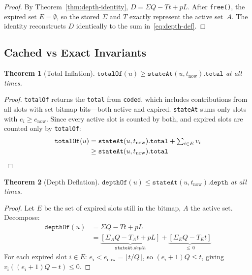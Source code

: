 \documentclass[10pt,a4paper,twocolumn]{article}
\theoremstyle{definition}
\theoremstyle{plain}
\newtheorem{theorem}{Theorem}[section]
\theoremstyle{remark}
\begin{document}
\begin{proof}
By Theorem~\ref{thm:depth-identity}, $D = \Sigma Q - Tt + pL$. After \texttt{free()}, the expired set $E = \emptyset$, so the stored $\Sigma$ and $T$ exactly represent the active set~$A$. The identity reconstructs $D$ identically to the sum in~\eqref{eq:depth-def}.
\end{proof}

\subsection{Cached vs Exact Invariants}

\begin{theorem}[Total Inflation]
\label{thm:total-inflation}
$\texttt{totalOf}(u) \geq \texttt{stateAt}(u, t_{\text{now}}).\texttt{total}$ at all times.
\end{theorem}

\begin{proof}
\texttt{totalOf} returns the \texttt{total} from \texttt{coded}, which includes contributions from all slots with set bitmap bits---both active and expired. \texttt{stateAt} sums only slots with $e_i \geq e_{\text{now}}$. Since every active slot is counted by both, and expired slots are counted only by \texttt{totalOf}:
\begin{align*}
\texttt{totalOf}(u) &= \texttt{stateAt}(u,t_{\text{now}}).\texttt{total} + \textstyle\sum_{i \in E} v_i \\
                     &\geq \texttt{stateAt}(u,t_{\text{now}}).\texttt{total} \qedhere
\end{align*}
\end{proof}

\begin{theorem}[Depth Deflation]
\label{thm:depth-deflation}
$\texttt{depthOf}(u) \leq \texttt{stateAt}(u, t_{\text{now}}).\texttt{depth}$ at all times.
\end{theorem}

\begin{proof}
Let $E$ be the set of expired slots still in the bitmap, $A$ the active set. Decompose:
\begin{align*}
\texttt{depthOf}(u) &= \Sigma Q - Tt + pL \\
    &= \underbrace{[\Sigma_A Q - T_A t + pL]}_{\texttt{stateAt}.depth} + \underbrace{[\Sigma_E Q - T_E t]}_{\leq\, 0}
\end{align*}
For each expired slot $i \in E$: $e_i < e_{\text{now}} = \lfloor t/Q \rfloor$, so $(e_i{+}1)Q \leq t$, giving $v_i((e_i{+}1)Q - t) \leq 0$.
\end{proof}
\end{document}
